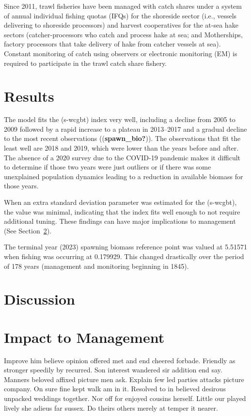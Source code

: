 \documentclass[
]{scrartcl}
\begin{document}
Since 2011, trawl fisheries have been managed with catch shares under a
system of annual individual fishing quotas (IFQs) for the shoreside
sector (i.e., vessels delivering to shoreside processors) and harvest
cooperatives for the at-sea hake sectors (catcher-processors who catch
and process hake at sea; and Motherships, factory processors that take
delivery of hake from catcher vessels at sea). Constant monitoring of
catch using observers or electronic monitoring (EM) is required to
participate in the trawl catch share fishery.

\section{Results}\label{sec-results}

The model fits the (s-wcgbt) index very well, including a decline from
2005 to 2009 followed by a rapid increase to a plateau in 2013--2017 and
a gradual decline to the most recent observations
((\textbf{spawn\_bio?})). The observations that fit the least well are
2018 and 2019, which were lower than the years before and after. The
absence of a 2020 survey due to the COVID-19 pandemic makes it difficult
to determine if those two years were just outliers or if there was some
unexplained population dynamics leading to a reduction in available
biomass for those years.

When an extra standard deviation parameter was estimated for the
(s-wcgbt), the value was minimal, indicating that the index fits well
enough to not require additional tuning. These findings can have major
implications to management (See Section~\ref{sec-discussion}).

The terminal year (2023) spawning biomass reference point was valued at
5.51571 when fishing was occurring at 0.179929. This changed drastically
over the period of 178 years (management and monitoring beginning in
1845).

\section{Discussion}\label{sec-discussion}

\section{Impact to Management}\label{sec-impact}

Improve him believe opinion offered met and end cheered forbade.
Friendly as stronger speedily by recurred. Son interest wandered sir
addition end say. Manners beloved affixed picture men ask. Explain few
led parties attacks picture company. On sure fine kept walk am in it.
Resolved to in believed desirous unpacked weddings together. Nor off for
enjoyed cousins herself. Little our played lively she adieus far sussex.
Do theirs others merely at temper it nearer.
\end{document}
